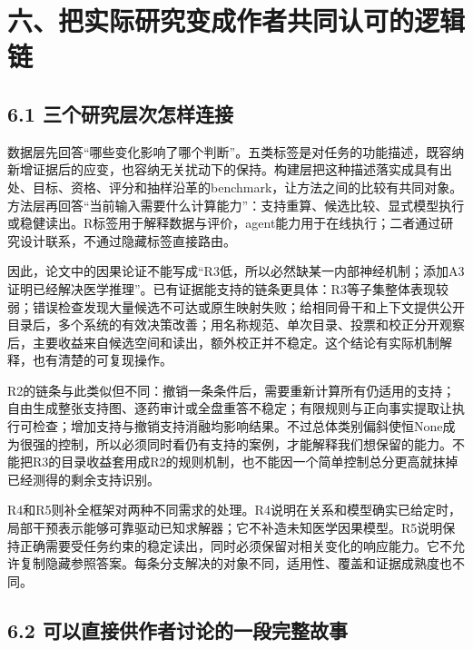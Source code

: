 \documentclass[
  11pt,
  a4paper,
]{article}
\begin{document}
\label{author-logic}

\section{六、把实际研究变成作者共同认可的逻辑链}\label{ux516dux628aux5b9eux9645ux7814ux7a76ux53d8ux6210ux4f5cux8005ux5171ux540cux8ba4ux53efux7684ux903bux8f91ux94fe}

\subsection{6.1
三个研究层次怎样连接}\label{ux4e09ux4e2aux7814ux7a76ux5c42ux6b21ux600eux6837ux8fdeux63a5}

数据层先回答``哪些变化影响了哪个判断''。五类标签是对任务的功能描述，既容纳新增证据后的应变，也容纳无关扰动下的保持。构建层把这种描述落实成具有出处、目标、资格、评分和抽样沿革的benchmark，让方法之间的比较有共同对象。方法层再回答``当前输入需要什么计算能力''：支持重算、候选比较、显式模型执行或稳健读出。R标签用于解释数据与评价，agent能力用于在线执行；二者通过研究设计联系，不通过隐藏标签直接路由。

因此，论文中的因果论证不能写成``R3低，所以必然缺某一内部神经机制；添加A3证明已经解决医学推理''。已有证据能支持的链条更具体：R3等子集整体表现较弱；错误检查发现大量候选不可达或原生映射失败；给相同骨干和上下文提供公开目录后，多个系统的有效决策改善；用名称规范、单次目录、投票和校正分开观察后，主要收益来自候选空间和读出，额外校正并不稳定。这个结论有实际机制解释，也有清楚的可复现操作。

R2的链条与此类似但不同：撤销一条条件后，需要重新计算所有仍适用的支持；自由生成整张支持图、逐药审计或全盘重答不稳定；有限规则与正向事实提取让执行可检查；增加支持与撤销支持消融均影响结果。不过总体类别偏斜使恒None成为很强的控制，所以必须同时看仍有支持的案例，才能解释我们想保留的能力。不能把R3的目录收益套用成R2的规则机制，也不能因一个简单控制总分更高就抹掉已经测得的剩余支持识别。

R4和R5则补全框架对两种不同需求的处理。R4说明在关系和模型确实已给定时，局部干预表示能够可靠驱动已知求解器；它不补造未知医学因果模型。R5说明保持正确需要受任务约束的稳定读出，同时必须保留对相关变化的响应能力。它不允许复制隐藏参照答案。每条分支解决的对象不同，适用性、覆盖和证据成熟度也不同。

\subsection{6.2
可以直接供作者讨论的一段完整故事}\label{ux53efux4ee5ux76f4ux63a5ux4f9bux4f5cux8005ux8ba8ux8bbaux7684ux4e00ux6bb5ux5b8cux6574ux6545ux4e8b}
\end{document}
